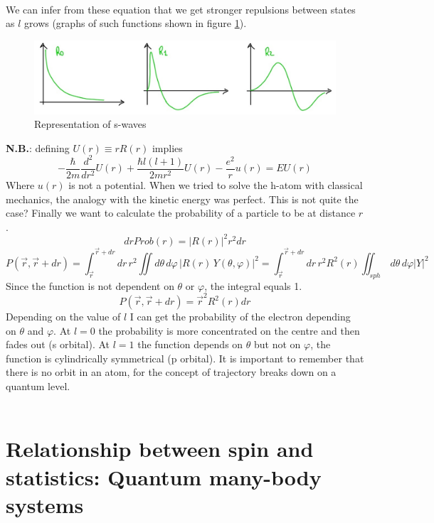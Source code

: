 \\
We can infer from these equation that we get stronger repulsions between states as $l$ grows (graphs of such functions shown in figure \ref{fig_swaves}).\\
\begin{figure}[htbp!]
	\centering
	\includegraphics[scale=0.30]{img_5}
	\caption{Representation of s-waves}
	\label{fig_swaves}
\end{figure}
\textbf{N.B.}: defining $U(r) \equiv rR(r)$ implies
\[
-\frac{\hbar}{2m} \frac{d^2}{dr^2} U(r) + \frac{\hbar l(l+1)}{2mr^2} U(r) - \frac{e^2}{r} u(r) = E U(r)
\]
Where $u(r)$ is not a potential. When we tried to solve the h-atom with classical mechanics, the analogy with the kinetic energy was perfect. This is not quite the case?
Finally we want to calculate the probability of a particle to be at distance $r$.
\[
drProb(r)=|R(r)|^2r^2dr
\]
\[
P(\vec{r},\vec{r}+dr)=\int_{\vec{r}}^{\vec{r}+dr}dr\,r^2\iint d\theta\,d\varphi\,|R(r)\,Y(\theta,\varphi)|^2=\int_{\vec{r}}^{\vec{r}+dr}dr\,r^2R^2(r)\iint_{sph}\,d\theta\,d\varphi|Y|^2
\]
Since the function is not dependent on $\theta$ or $\varphi$, the integral equals 1.
\[
P(\vec{r},\vec{r}+dr)=\vec{r}^2R^2(r)dr
\]
Depending on the value of $l$ I can get the probability of the electron depending on $\theta$ and $\varphi$. At $l=0$ the probability is more concentrated on the centre and then fades out (s orbital). At $l=1$ the function depends on $\theta$ but not on $\varphi$, the function is cylindrically symmetrical (p orbital). It is important to remember that there is no orbit in an atom, for the concept of trajectory breaks down on a quantum level.\\
\\

\section{Relationship between spin and statistics: Quantum many-body systems}
